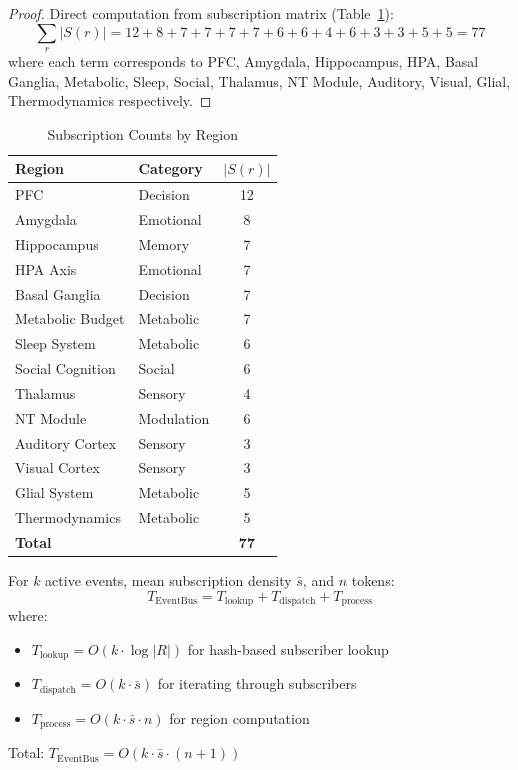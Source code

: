 \documentclass[preprint,12pt]{elsarticle}
\begin{document}
\begin{proof}
Direct computation from subscription matrix (Table~\ref{tab:subscription_counts}):
\begin{equation}
\sum_r |S(r)| = 12 + 8 + 7 + 7 + 7 + 7 + 6 + 6 + 4 + 6 + 3 + 3 + 5 + 5 = 77
\end{equation}
where each term corresponds to PFC, Amygdala, Hippocampus, HPA, Basal Ganglia, Metabolic, Sleep, Social, Thalamus, NT Module, Auditory, Visual, Glial, Thermodynamics respectively.
\end{proof}

\begin{table}[htbp]
\centering
\caption{Subscription Counts by Region}
\label{tab:subscription_counts}
\begin{tabular}{llc}
\toprule
\textbf{Region} & \textbf{Category} & \textbf{$|S(r)|$} \\
\midrule
PFC & Decision & 12 \\
Amygdala & Emotional & 8 \\
Hippocampus & Memory & 7 \\
HPA Axis & Emotional & 7 \\
Basal Ganglia & Decision & 7 \\
Metabolic Budget & Metabolic & 7 \\
Sleep System & Metabolic & 6 \\
Social Cognition & Social & 6 \\
Thalamus & Sensory & 4 \\
NT Module & Modulation & 6 \\
Auditory Cortex & Sensory & 3 \\
Visual Cortex & Sensory & 3 \\
Glial System & Metabolic & 5 \\
Thermodynamics & Metabolic & 5 \\
\midrule
\textbf{Total} & & \textbf{77} \\
\bottomrule
\end{tabular}
\end{table}

\begin{theorem}
For $k$ active events, mean subscription density $\bar{s}$, and $n$ tokens:
\begin{equation}
T_{\text{EventBus}} = T_{\text{lookup}} + T_{\text{dispatch}} + T_{\text{process}}
\end{equation}
where:
\begin{itemize}
\item $T_{\text{lookup}} = O(k \cdot \log |R|)$ for hash-based subscriber lookup
\item $T_{\text{dispatch}} = O(k \cdot \bar{s})$ for iterating through subscribers
\item $T_{\text{process}} = O(k \cdot \bar{s} \cdot n)$ for region computation
\end{itemize}
Total: $T_{\text{EventBus}} = O(k \cdot \bar{s} \cdot (n + 1))$
\end{theorem}
\end{document}
